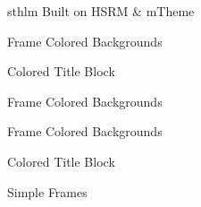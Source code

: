 \documentclass[newPxFont]{beamer}
\begin{document}
\begin{frame}[c]{sthlm Built on HSRM \& mTheme}
\begin{frame}{Frame Colored Backgrounds}

\end{frame}
\endgroup

\begingroup
{}
\begin{frame}[plain]{Colored Title Block}


\end{frame}
\endgroup

\begingroup
{}
\begin{frame}{Frame Colored Backgrounds}


\end{frame}
\endgroup

\begingroup
{}
\begin{frame}{Frame Colored Backgrounds}

\end{frame}
\endgroup

\begingroup
{}
\begin{frame}[plain]{Colored Title Block}



\end{frame}
\endgroup

\begingroup
{}
\begin{frame}{Simple Frames}


\end{frame}
\endgroup

\begingroup
{}
\begin{frame}[plain]


\end{frame}
\end{frame}
\end{document}

